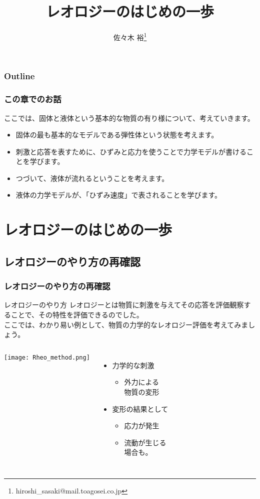 \documentclass[12pt, dvipdfmx]{beamer}
\title
[レオロジーのはじめの一歩]
{レオロジーのはじめの一歩}
\author[東亞合成　佐々木]{佐々木 裕\thanks{hiroshi\_sasaki@mail.toagosei.co.jp}}
\institute[東亞合成]{東亞合成株式会社}
\date{}
\begin{document}
\maketitle

\begin{frame}
\frametitle{Outline}
\tableofcontents
\end{frame}

\begin{frame}
	\frametitle{この章でのお話}
	ここでは、固体と液体という基本的な物質の有り様について、考えていきます。
		\begin{boxnote}
			\begin{itemize}
				\item 固体の最も基本的なモデルである弾性体という状態を考えます。
				\item 刺激と応答を表すために、ひずみと応力を使うことで力学モデルが書けることを学びます。
				\item つづいて、液体が流れるということを考えます。
				\item 液体の力学モデルが、「ひずみ速度」で表されることを学びます。
			\end{itemize} 
		\end{boxnote}
\end{frame}

\section{レオロジーのはじめの⼀歩}
\subsection{レオロジーのやり方の再確認}
\begin{frame}
	\frametitle{レオロジーのやり方の再確認}
	\begin{block}{レオロジーのやり方}
		レオロジーとは物質に刺激を与えてその応答を評価観察することで、その特性を評価できるのでした。\\
	ここでは、わかり易い例として、物質の力学的なレオロジー評価を考えてみましょう。
	\end{block}
	\begin{columns}[T, onlytextwidth]
			\texttt{[image: Rheo\_method.png]}
			\begin{itemize}
				\item 力学的な刺激
				\begin{itemize}
					\item 外力による\\物質の変形
				\end{itemize}
				\item 変形の結果として
				\begin{itemize}
					\item 応力が発生
					\item 流動が生じる\\場合も。
				\end{itemize}
			\end{itemize}
	\end{columns}
\end{frame}
\end{document}
